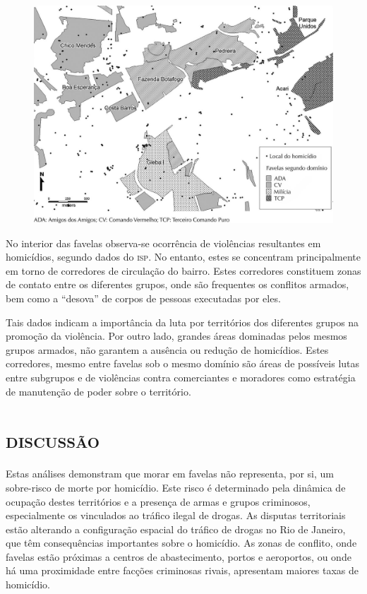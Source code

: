 \documentclass{article}
\begin{document}
\begin{figure}
\includegraphics[width=\textwidth]{0034-8910-rsp-48-01-0094-gf03}
\caption{}\label{fig:f03}
\end{figure}

No interior das favelas observa-se ocorrência de violências resultantes em
homicídios, segundo dados do \textsc{isp}. No entanto, estes se concentram principalmente
em torno de corredores de circulação do bairro. Estes corredores constituem
zonas de contato entre os diferentes grupos, onde são frequentes os conflitos
armados, bem como a “desova” de corpos de pessoas executadas por eles.

Tais dados indicam a importância da luta por territórios dos diferentes grupos
na promoção da violência. Por outro lado, grandes áreas dominadas pelos mesmos
grupos armados, não garantem a ausência ou redução de homicídios. Estes
corredores, mesmo entre favelas sob o mesmo domínio são áreas de possíveis lutas
entre subgrupos e de violências contra comerciantes e moradores como estratégia
de manutenção de poder sobre o território.

\section{\textsc{discussão}}

Estas análises demonstram que morar em favelas não representa, por si, um
sobre-risco de morte por homicídio. Este risco é determinado pela dinâmica de
ocupação destes territórios e a presença de armas e grupos criminosos,
especialmente os vinculados ao tráfico ilegal de drogas. As disputas
territoriais estão alterando a configuração espacial do tráfico de drogas no Rio
de Janeiro, que têm consequências importantes sobre o homicídio. As zonas de
conflito, onde favelas estão próximas a centros de abastecimento, portos e
aeroportos, ou onde há uma proximidade entre facções criminosas rivais,
apresentam maiores taxas de homicídio.
\end{document}
